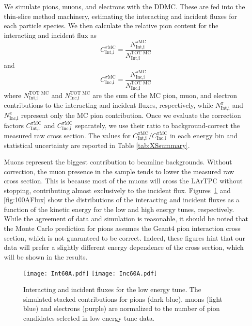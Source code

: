 \documentclass[%
 floatfix,
 reprint,
 twocolumn,
superscriptaddress,
showpacs,preprintnumbers,
 amsmath,amssymb,
 aps,
prd,
]{revtex4-1}
\begin{document}
We simulate pions, muons, and electrons with the DDMC.  These are fed into the thin-slice method machinery, estimating the interacting and incident fluxes for each particle species. We then calculate the relative pion content for the interacting and incident flux as
\begin{equation}
C^{\pi \text{MC}}_{\text{Int,i}}  =  \frac{N^{\pi \text{MC}}_{\text{Int,i}}}{ N^{\text{TOT MC}}_{\text{Int,i}} } 
\end{equation}
and 
\begin{equation}
C^{\pi \text{MC}}_{\text{Inc,i}}  =  \frac{N^{\pi \text{MC}}_{\text{Inc,i}}}{ N^{\text{TOT MC}}_{\text{Inc,i}} } 
\end{equation}
where 
$N^{\text{TOT MC}}_{\text{Int,i}}$ and $N^{\text{TOT MC}}_{\text{Inc,i}}$ are the sum of the MC pion, muon, and electron contributions to the interacting and incident fluxes, respectively, while $N^{\pi}_{\text{Int,i}}$ and $N^{\pi}_{\text{Inc,i}}$ represent only the MC pion contribution. Once we evaluate the correction factors $C^{\pi \text{MC}}_{\text{Int,i}}$ and  $C^{\pi \text{MC}}_{\text{Inc,i}}$ separately, we use their ratio to background-correct the measured raw cross section. The values for $C^{\pi \text{MC}}_{\text{Int,i}}/C^{\pi \text{MC}}_{\text{Inc,i}}$ in each energy bin and statistical uncertainty are reported in Table \ref{tab:XSsummary}.

Muons represent the biggest contribution to beamline backgrounds. Without correction, the muon presence in the sample tends to lower the measured raw cross section. This is because most of the muons will cross the LArTPC without stopping, contributing almost exclusively to the incident flux. Figures~\ref{fig:60AFlux} and  \ref{fig:100AFlux} show the distributions of the interacting and incident fluxes as a function of the kinetic energy for the low and high energy tunes, respectively. While the agreement of data and simulation is reasonable, it should be noted that the Monte Carlo  prediction for pions assumes the Geant4 pion interaction cross section, which is not guaranteed to be correct. Indeed, these figures hint that our data will prefer a slightly different energy dependence of the cross section, which will be shown in the results. 



\begin{figure}
\centering
\texttt{[image: Int60A.pdf]}
\texttt{[image: Inc60A.pdf]}
\caption{\label{fig:60AFlux} Interacting and incident fluxes for the low energy tune. The simulated stacked contributions for pions (dark blue), muons (light blue) and electrons (purple) are normalized to the number of pion  candidates selected in low energy tune data.}
\end{figure}
\end{document}
